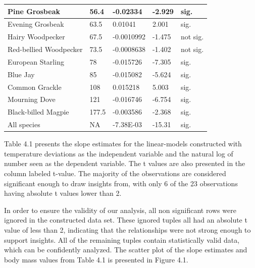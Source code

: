 \begin{longtable}[c]{|l|l|l|l|l|}
Pine Grosbeak             & 56.4              & -0.02334       & -2.929  & sig.     \\ \hline
Evening Grosbeak          & 63.5              & 0.01041        & 2.001   & sig.     \\ \hline
Hairy Woodpecker          & 67.5              & -0.0010992     & -1.475  & not sig. \\ \hline
Red-bellied Woodpecker    & 73.5              & -0.0008638     & -1.402  & not sig. \\ \hline
European Starling         & 78                & -0.015726      & -7.305  & sig.     \\ \hline
Blue Jay                  & 85                & -0.015082      & -5.624  & sig.     \\ \hline
Common Grackle            & 108               & 0.015218       & 5.003   & sig.     \\ \hline
Mourning Dove             & 121               & -0.016746      & -6.754  & sig.     \\ \hline
Black-billed Magpie       & 177.5             & -0.003586      & -2.368  & sig.     \\ \hline
All species               & NA                & -7.38E-03      & -15.31  & sig.     \\ \hline
\end{longtable}

Table 4.1 presents the slope estimates for the linear-models constructed with temperature deviations as the independent variable and the natural log of number seen as the dependent variable. The t values are also presented in the column labeled t-value. The majority of the observations are considered significant enough to draw insights from, with only 6 of the 23 observations having absolute t values lower than 2. 

In order to ensure the validity of our analysis, all non significant rows were ignored in the constructed data set. These ignored tuples all had an absolute t value of less than 2, indicating that the relationships were not strong enough to support insights. All of the remaining tuples contain statistically valid data, which can be confidently analyzed. The scatter plot of the slope estimates and body mass values from Table 4.1 is presented in Figure 4.1.

